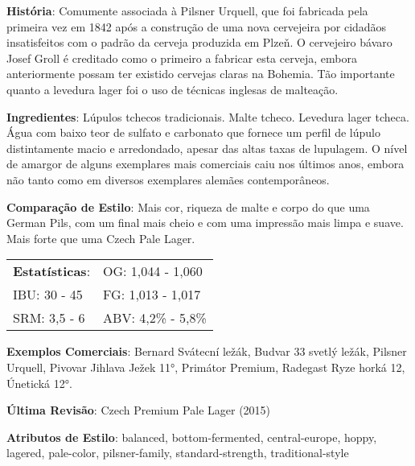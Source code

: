 \textbf{História}: Comumente associada à Pilsner Urquell, que foi fabricada pela primeira vez em 1842 após a construção de uma nova cervejeira por cidadãos insatisfeitos com o padrão da cerveja produzida em Plzeň. O cervejeiro bávaro Josef Groll é creditado como o primeiro a fabricar esta cerveja, embora anteriormente possam ter existido cervejas claras na Bohemia. Tão importante quanto a levedura lager foi o uso de técnicas inglesas de malteação.

\textbf{Ingredientes}: Lúpulos tchecos tradicionais. Malte tcheco. Levedura lager tcheca. Água com baixo teor de sulfato e carbonato que fornece um perfil de lúpulo distintamente macio e arredondado, apesar das altas taxas de lupulagem. O nível de amargor de alguns exemplares mais comerciais caiu nos últimos anos, embora não tanto como em diversos exemplares alemães contemporâneos.

\textbf{Comparação de Estilo}: Mais cor, riqueza de malte e corpo do que uma German Pils, com um final mais cheio e com uma impressão mais limpa e suave. Mais forte que uma Czech Pale Lager.

\begin{tabular}{@{}p{35mm}p{35mm}@{}}
  \textbf{Estatísticas}: & OG: 1,044 - 1,060 \\
  IBU: 30 - 45  & FG: 1,013 - 1,017  \\
  SRM: 3,5 - 6  & ABV: 4,2\% - 5,8\%
\end{tabular}

\textbf{Exemplos Comerciais}: Bernard Svátecní ležák, Budvar 33 svetlý ležák, Pilsner Urquell, Pivovar Jihlava Ježek 11°, Primátor Premium, Radegast Ryze horká 12, Únetická 12°.

\textbf{Última Revisão}: Czech Premium Pale Lager (2015)

\textbf{Atributos de Estilo}: balanced, bottom-fermented, central-europe, hoppy, lagered, pale-color, pilsner-family, standard-strength, traditional-style
